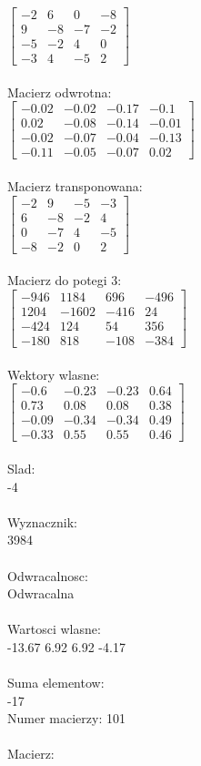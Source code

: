 \documentclass[a4paper,12pt]{article}
\begin{document}
$\begin{bmatrix} -2&6&0&-8\\9&-8&-7&-2\\-5&-2&4&0\\-3&4&-5&2 \end{bmatrix}$
\\
\\
Macierz odwrotna:\\

$\begin{bmatrix} -0.02&-0.02&-0.17&-0.1\\0.02&-0.08&-0.14&-0.01\\-0.02&-0.07&-0.04&-0.13\\-0.11&-0.05&-0.07&0.02 \end{bmatrix}$
\\
\\
Macierz transponowana:\\

$\begin{bmatrix} -2&9&-5&-3\\6&-8&-2&4\\0&-7&4&-5\\-8&-2&0&2 \end{bmatrix}$
\\
\\
Macierz do potegi 3:\\

$\begin{bmatrix} -946&1184&696&-496\\1204&-1602&-416&24\\-424&124&54&356\\-180&818&-108&-384 \end{bmatrix}$
\\
\\
Wektory wlasne:\\

$\begin{bmatrix} -0.6&-0.23&-0.23&0.64\\0.73&0.08&0.08&0.38\\-0.09&-0.34&-0.34&0.49\\-0.33&0.55&0.55&0.46 \end{bmatrix}$
\\
\\
Slad:\\
-4
\\
\\
Wyznacznik:\\
3984
\\
\\
Odwracalnosc:\\
Odwracalna
\\
\\
Wartosci wlasne:\\
-13.67 6.92 6.92 -4.17
\\
\\
Suma elementow:\\
-17
\\
\newpage
Numer macierzy:
101
\\
\\
Macierz:\\
\end{document}
